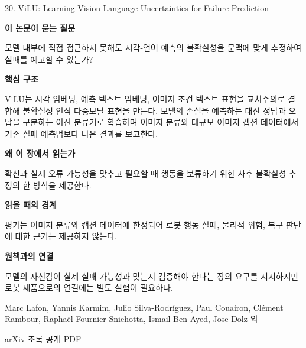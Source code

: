 \documentclass[11pt,openany]{book}
\begin{document}
\begin{termcard}{20. ViLU: Learning Vision-Language Uncertainties for Failure Prediction}

\par

\medskip

{\sffamily\bfseries\color{deepblue} 이 논문이 묻는 질문}\par

모델 내부에 직접 접근하지 못해도 시각-언어 예측의 불확실성을 문맥에 맞게 추정하여 실패를 예고할 수 있는가?

\smallskip

{\sffamily\bfseries\color{deepblue} 핵심 구조}\par

ViLU는 시각 임베딩, 예측 텍스트 임베딩, 이미지 조건 텍스트 표현을 교차주의로 결합해 불확실성 인식 다중모달 표현을 만든다. 모델의 손실을 예측하는 대신 정답과 오답을 구분하는 이진 분류기로 학습하며 이미지 분류와 대규모 이미지-캡션 데이터에서 기존 실패 예측법보다 나은 결과를 보고한다.

\smallskip

{\sffamily\bfseries\color{deepblue} 왜 이 장에서 읽는가}\par

확신과 실제 오류 가능성을 맞추고 필요할 때 행동을 보류하기 위한 사후 불확실성 추정의 한 방식을 제공한다.

\smallskip

{\sffamily\bfseries\color{coral} 읽을 때의 경계}\par

평가는 이미지 분류와 캡션 데이터에 한정되어 로봇 행동 실패, 물리적 위험, 복구 판단에 대한 근거는 제공하지 않는다.

\smallskip

{\sffamily\bfseries\color{teal} 원책과의 연결}\par

모델의 자신감이 실제 실패 가능성과 맞는지 검증해야 한다는 장의 요구를 지지하지만 로봇 제품으로의 연결에는 별도 실험이 필요하다.

\medskip

{\footnotesize\color{muted} Marc Lafon, Yannis Karmim, Julio Silva-Rodríguez, Paul Couairon, Clément Rambour, Raphaël Fournier-Sniehotta, Ismail Ben Ayed, Jose Dolz 외\par

\href{https://arxiv.org/abs/2507.07620}{arXiv 초록} \quad \href{https://arxiv.org/pdf/2507.07620}{공개 PDF}\par}

\end{termcard}
\end{document}
